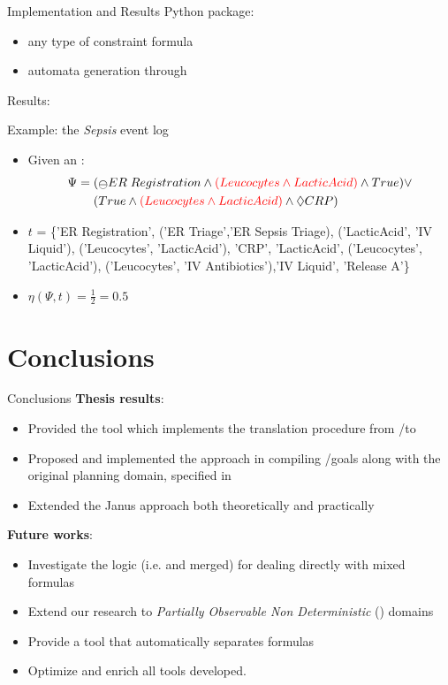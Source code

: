 \documentclass[10pt]{beamer}
\begin{document}
\begin{frame}{Implementation and Results}
\janus Python package:
	\begin{itemize}
		\item any type of constraint formula
		\item automata generation through \LTLfToDFA
	\end{itemize}
Results:
\begin{exampleblock}{Example: the \textit{Sepsis}\footnotemark\xspace event log}
\begin{itemize}
\item Given an \rcon\xspace:
\begin{align*}
\Psi = \;& (\Yesterday ER\; Registration \lAND \color{red}(Leucocytes \lAND LacticAcid) \color{black} \lAND True) \lOR\\
& (True \lAND \color{red}(Leucocytes \lAND LacticAcid) \color{black} \lAND \Diamond CRP)
\end{align*}
\item $t$ = \{'ER Registration', ('ER Triage','ER Sepsis Triage), ('LacticAcid', 'IV Liquid'),  ('Leucocytes', 'LacticAcid'), 'CRP', 'LacticAcid', ('Leucocytes', 'LacticAcid'), ('Leucocytes', 'IV Antibiotics'),'IV Liquid', 'Release A'\}
\item $\eta(\Psi, t) = \tfrac{1}{2} = 0.5$
\end{itemize}
\end{exampleblock}
\end{frame}

\section{Conclusions}
\begin{frame}{Conclusions}
	\textbf{Thesis results}:
	\begin{itemize}
		\item Provided the \LTLfToDFA tool which implements the translation procedure from \LTLf/\PLTL to \DFA
		\item Proposed and implemented the \FONDFOR approach in compiling \LTLf/\PLTL goals along with the original planning domain, specified in \PDDL
		\item Extended the Janus approach both theoretically and practically
	\end{itemize}
	\vspace{0.5cm}
\textbf{Future works}:
	\begin{itemize}
		\item Investigate the \LTLp logic (i.e. \LTLf and \PLTL merged) for dealing directly with mixed formulas 
		\item Extend our research to \textit{Partially Observable Non Deterministic} (\POND) domains
		\item Provide a tool that automatically separates \LTLp formulas
		\item Optimize and enrich all tools developed.
	\end{itemize}
\end{frame}
\end{document}
